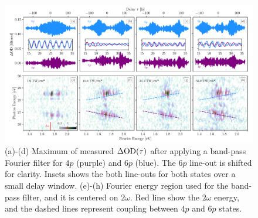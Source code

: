 \begin{figure}%
	\includegraphics[width=\textwidth]{figures/ATS/dOD_lp_lineouts.pdf}
	\caption[Line-outs of $\dod(\tau)$ after applying a $2\omega$ Fourier band-pass filter]{(a)-(d) Maximum of measured $\dod(\tau)$ after applying a band-pass Fourier filter for $4p$ (purple) and $6p$ (blue). The $6p$ line-out is shifted for clarity.  Insets shows the both line-outs for both states over a small delay window. (e)-(h) Fourier energy region used for the band-pass filter, and it is centered on $2\omega$.  Red line show the $2\omega$ energy, and the dashed lines represent coupling between $4p$ and $6p$ states.}
	\label{fig:dOD_bp_lineouts}
\end{figure}

